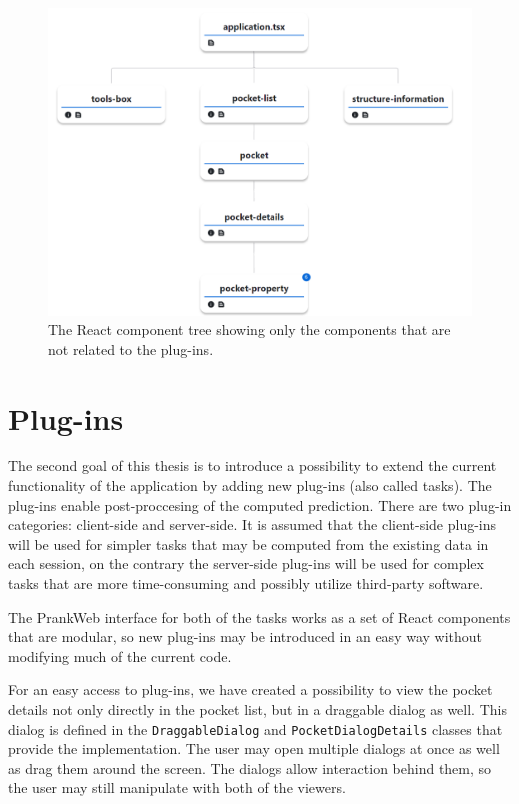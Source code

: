 \begin{figure}[htb]
    \centering
    \includegraphics[width=\textwidth]{img/react_molstar.pdf}
    \caption{The React component tree showing only the components that are not related to the plug-ins.}
    \label{fig:react-molstar}
\end{figure}

\section{Plug-ins}
\label{sec:plugins}

The second goal of this thesis is to introduce a possibility to extend the current functionality of the application by adding new plug-ins (also called tasks). The plug-ins enable post-proccesing of the computed prediction. There are two plug-in categories: client-side and server-side. It is assumed that the client-side plug-ins will be used for simpler tasks that may be computed from the existing data in each session, on the contrary the server-side plug-ins will be used for complex tasks that are more time-consuming and possibly utilize third-party software.

The PrankWeb interface for both of the tasks works as a set of React components that are modular, so new plug-ins may be introduced in an easy way without modifying much of the current code.

For an easy access to plug-ins, we have created a possibility to view the pocket details not only directly in the pocket list, but in a draggable dialog as well. This dialog is defined in the \texttt{DraggableDialog} and \texttt{PocketDialogDetails} classes that provide the implementation. The user may open multiple dialogs at once as well as drag them around the screen. The dialogs allow interaction behind them, so the user may still manipulate with both of the viewers.


